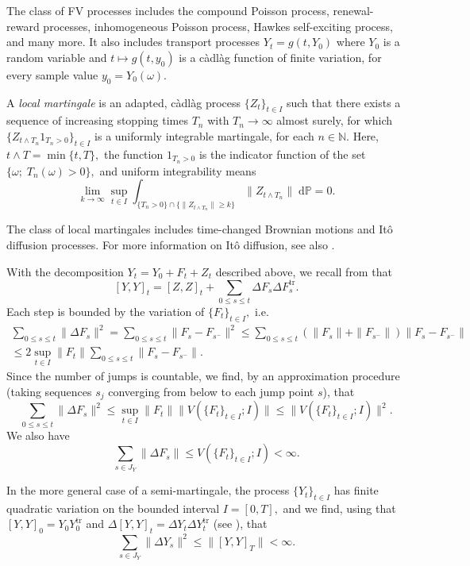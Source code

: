 \documentclass[reqno,12pt]{amsart}
\theoremstyle{plain} %
\theoremstyle{definition} %
\newcommand{\tr}{{\operatorname{tr}}}
\begin{document}
The class of FV processes includes the compound Poisson process, renewal-reward processes, inhomogeneous Poisson process, Hawkes self-exciting process, and many more. It also includes transport processes $Y_t = g(t, Y_0)$ where $Y_0$ is a random variable and $t \mapsto g(t, y_0)$ is a c\`adl\`ag function of finite variation, for every sample value $y_0=Y_0(\omega)$.

A \emph{local martingale} is an adapted, c\`adl\`ag process $\{Z_t\}_{t\in I}$ such that there exists a sequence of increasing stopping times $T_n$ with $T_n \rightarrow \infty$ almost surely, for which $\{Z_{t \wedge T_n}1_{T_n > 0}\}_{t \in I}$ is a uniformly integrable martingale, for each $n\in\mathbb{N}.$ Here, $t \land T = \min\{t, T\},$ the function $1_{T_n > 0}$ is the indicator function of the set $\{\omega; \;T_n(\omega) > 0\},$ and uniform integrability means
\[
  \lim_{k\rightarrow \infty}\sup_{t \in I} \int_{\{T_n > 0\}\cap\{\|Z_{t\wedge T_n}\| \geq k\}}\|Z_{t\wedge T_n}\|\;\mathrm{d}\mathbb{P} = 0.
\]


The class of local martingales includes time-changed Brownian motions and It\^o diffusion processes. For more information on It\^o diffusion, see also \cite{Oksendal2003}.

With the decomposition $Y_t = Y_0 + F_t + Z_t$ described above, we recall from \cite[Lemma 18.7]{Metivier1982} that
\[
    [Y, Y]_t = [Z, Z]_t + \sum_{0 \leq s \leq t} \Delta F_s \Delta F_s^\tr.
\]
Each step is bounded by the variation of $\{F_t\}_{t\in I},$ i.e.
\begin{multline*}
    \sum_{0 \leq s \leq t} \|\Delta F_s\|^2 = \sum_{0 \leq s \leq t} \|F_s - F_{s^-}\|^2 \leq \sum_{0 \leq s \leq t} (\|F_s\| + \|F_{s^-}\|)\|F_s - F_{s^-}\| \\
    \leq 2\sup_{t\in I} \|F_t\| \sum_{0 \leq s \leq t} \|F_s - F_{s^-}\|.
\end{multline*}
Since the number of jumps is countable, we find, by an approximation procedure (taking sequences $s_j$ converging from below to each jump point $s$), that
\[
    \sum_{0 \leq s \leq t} \|\Delta F_s\|^2 \leq \sup_{t\in I} \|F_t\| \|V(\{F_t\}_{t\in I}; I)\| \leq \|V(\{F_t\}_{t\in I}; I)\|^2.
\]
We also have
\begin{equation}
    \label{estimatejumpfv}
    \sum_{s\in J_{Y}} \|\Delta F_s\| \leq V(\{F_t\}_{t\in I}; I) < \infty.
\end{equation}

In the more general case of a semi-martingale, the process $\{Y_t\}_{t\in I}$ has finite quadratic variation \cite[Section II.6]{Protter2005} on the bounded interval $I=[0, T],$ and we find, using that $[Y, Y]_0 = Y_0 Y_0^\tr$ and $\Delta [Y, Y]_t = \Delta Y_t \Delta Y_t^\tr$ (see \cite[Theorem II.22]{Protter2005}), that
\begin{equation}
    \label{estimatejumpsemimartingale}
    \sum_{s\in J_{Y}} \|\Delta Y_s\|^2 \leq \|[Y, Y]_T\| < \infty.
\end{equation}
\end{document}
